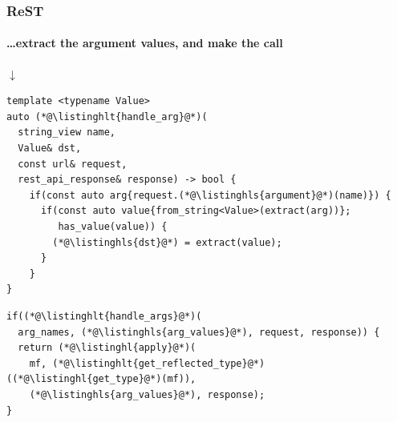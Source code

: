 \documentclass[compress,table,xcolor=table]{beamer}
\begin{document}
\begin{frame}[fragile]
  \frametitle{ReST}
  \framesubtitle{\ldots extract the argument values, and make the call}
  \smaller
  \centering $\downarrow$
  \begin{lstlisting}[language=c++2x,basicstyle=\scriptsize\ttfamily]
template <typename Value>
auto (*@\listinghlt{handle_arg}@*)(
  string_view name,
  Value& dst,
  const url& request,
  rest_api_response& response) -> bool {
    if(const auto arg{request.(*@\listinghls{argument}@*)(name)}) {
      if(const auto value{from_string<Value>(extract(arg))};
         has_value(value)) {
        (*@\listinghls{dst}@*) = extract(value);
      }
    }
}
  \end{lstlisting}
  \begin{lstlisting}[language=c++2x,basicstyle=\footnotesize\ttfamily]
if((*@\listinghlt{handle_args}@*)(
  arg_names, (*@\listinghls{arg_values}@*), request, response)) {
  return (*@\listinghl{apply}@*)(
    mf, (*@\listinghlt{get_reflected_type}@*)((*@\listinghl{get_type}@*)(mf)),
    (*@\listinghls{arg_values}@*), response);
}
  \end{lstlisting}
\end{frame}
\end{document}
